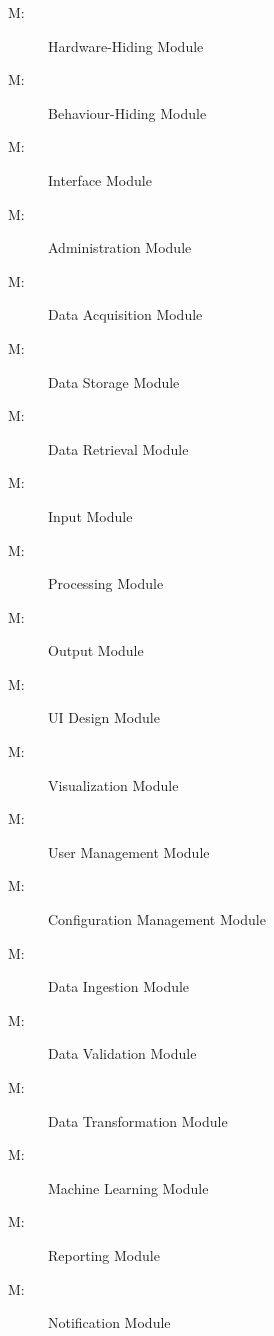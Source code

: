 \documentclass[12pt, titlepage]{article}
\newcounter{mnum}
\newcommand{\mthemnum}{M\themnum}
\begin{document}
\begin{description}
\item [ \mthemnum \label{mHH}:] Hardware-Hiding Module
\item [ \mthemnum \label{mBH}:] Behaviour-Hiding Module
\item [ \mthemnum \label{mIN}:] Interface Module 
\item [ \mthemnum \label{mAD}:] Administration Module 
\item [ \mthemnum \label{mDA}:] Data Acquisition Module 
\item [ \mthemnum \label{mDS}:] Data Storage Module 
\item [ \mthemnum \label{mDR}:] Data Retrieval Module 
\item [ \mthemnum \label{mINP}:] Input Module 
\item [ \mthemnum \label{mPR}:] Processing Module 
\item [ \mthemnum \label{mOU}:] Output Module 
\item [ \mthemnum \label{mUID}:] UI Design Module
\item [ \mthemnum \label{mVI}:] Visualization Module
\item [ \mthemnum \label{mUM}:] User Management Module 
\item [ \mthemnum \label{mCM}:] Configuration Management Module
\item [ \mthemnum \label{mDI}:] Data Ingestion Module
\item [ \mthemnum \label{mDV}:] Data Validation Module 
\item [ \mthemnum \label{mDT}:] Data Transformation Module 
\item [ \mthemnum \label{mML}:] Machine Learning Module
\item [ \mthemnum \label{mRE}:] Reporting Module 
\item [ \mthemnum \label{mNO}:] Notification Module
\end{description}
\end{document}
